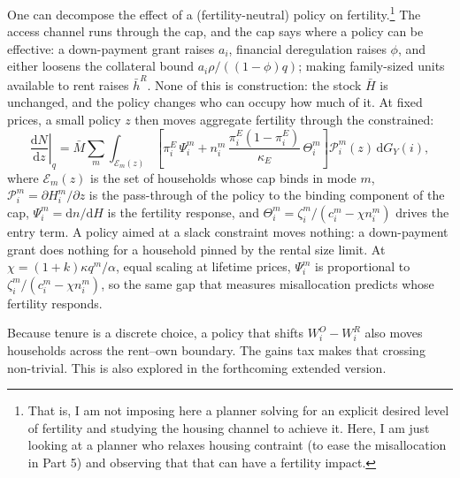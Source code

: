 \documentclass[11pt]{article}
\newcommand{\dd}{\mathrm d}
\begin{document}
One can decompose the effect of a (fertility-neutral) policy on fertility.\footnote{That is, I am not imposing here a planner solving for an explicit desired level of fertility and studying the housing channel to achieve it. Here, I am just looking at a planner who relaxes housing contraint (to ease the misallocation in Part 5) and observing that that can have a fertility impact.} The access channel runs through the cap, and the cap says where a policy can be effective: a down-payment grant raises $a_i$, financial deregulation raises $\phi$, and either loosens the collateral bound $a_i\rho/((1-\phi)q)$; making family-sized units available to rent raises $\bar h^R$. None of this is construction: the stock $\bar H$ is unchanged, and the policy changes who can occupy how much of it. At fixed prices, a small policy $z$ then moves aggregate fertility through the constrained:
\[
\left.\frac{\dd N}{\dd z}\right|_{q}
=
\bar M\sum_{m}\int_{\mathcal E_m(z)}
\left[\pi_i^E\,\Psi_i^m+n_i^m\,\frac{\pi_i^E(1-\pi_i^E)}{\kappa_E}\,\Theta_i^m\right]
\mathcal P_i^m(z)\,\dd G_Y(i),
\]
where $\mathcal E_m(z)$ is the set of households whose cap binds in mode $m$, $\mathcal P_i^m=\partial H_i^m/\partial z$ is the pass-through of the policy to the binding component of the cap, $\Psi_i^m=\dd n/\dd H$ is the fertility response, and $\Theta_i^m=\zeta_i^m/(c_i^m-\chi n_i^m)$ drives the entry term. A policy aimed at a slack constraint moves nothing: a down-payment grant does nothing for a household pinned by the rental size limit. At $\chi=(1+k)\kappa q^m/\alpha$, equal scaling at lifetime prices, $\Psi_i^m$ is proportional to $\zeta_i^m/(c_i^m-\chi n_i^m)$, so the same gap that measures misallocation predicts whose fertility responds.

Because tenure is a discrete choice, a policy that shifts $W_i^O-W_i^R$ also moves households across the rent--own boundary. The gains tax makes that crossing non-trivial. This is also explored in the forthcoming extended version.



\end{document}
